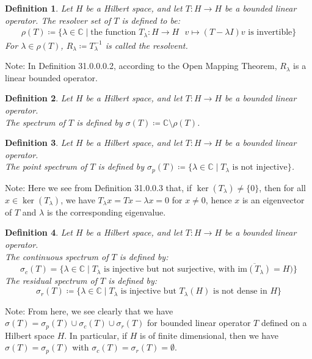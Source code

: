 \documentclass[11pt]{book}
\theoremstyle{break}
\theoremstyle{break}
\newtheorem{defn}{Definition}[corL]
\newcommand{\C}{\mathbb{C}}
\newcommand{\im}{\text{im}}
\newcommand{\note}{\color{red}Note: \color{black}}
\begin{document}
\begin{defn}
Let $H$ be a Hilbert space, and let $T:H \to H$ be a bounded linear operator. The resolver set of $T$ is defined to be:
\begin{align*}
\rho(T) \coloneqq\{ \lambda \in \C \mid \text{the function }T_{\lambda}: H \to H \ \ \ v\mapsto (T-\lambda I)v  \text{ is invertible}\}
\end{align*}
For $\lambda \in \rho(T)$, $R_{\lambda}\coloneqq T^{-1}_{\lambda}$ is called the resolvent. 
\end{defn}
\note In Definition 31.0.0.0.2, according to the Open Mapping Theorem, $R_{\lambda}$ is a linear bounded operator.

\begin{defn}
Let $H$ be a Hilbert space, and let $T:H \to H$ be a bounded linear operator. \\
The spectrum of $T$ is defined by $\sigma(T) \coloneqq \C\setminus \rho(T)$. 
\end{defn}

\begin{defn}
Let $H$ be a Hilbert space, and let $T:H \to H$ be a bounded linear operator. \\
The point spectrum of $T$ is defined by $\sigma_p(T) \coloneqq \{\lambda \in \C \mid T_{\lambda} \text{ is not injective}\}$.
\end{defn}
\note Here we see from Definition 31.0.0.3 that, if $\ker(T_{\lambda })\neq \{0\}$, then for all $x \in \ker(T_{\lambda})$, we have $T_{\lambda }x =Tx - \lambda x = 0$ for $x \neq 0$, hence $x$ is an eigenvector of $T$ and $\lambda$ is the corresponding eigenvalue. 

\begin{defn}
Let $H$ be a Hilbert space, and let $T:H \to H$ be a bounded linear operator. \\
The continuous spectrum of $T$ is defined by:
$$\sigma_c(T) = \{ \lambda \in \C \mid T_{\lambda} \text{ is injective but not surjective, with }\overline{\im(T_{\lambda })}= H)\}$$
The residual spectrum of $T$ is defined by:
$$\sigma_r(T) \coloneqq \{ \lambda \in \C \mid T_{\lambda}\text{ is injective but }T_{\lambda}(H)\text{ is not dense in }H\}$$
\end{defn}

\note From here, we see clearly that we have $\sigma(T) = \sigma_p(T) \cup \sigma_c(T) \cup \sigma_r(T)$ for bounded linear operator $T$ defined on a Hilbert space $H$. In particular, if $H$ is of finite dimensional, then we have $\sigma(T) = \sigma_p(T)$ with $\sigma_c(T) = \sigma_r(T) = \emptyset$.\\
\end{document}
